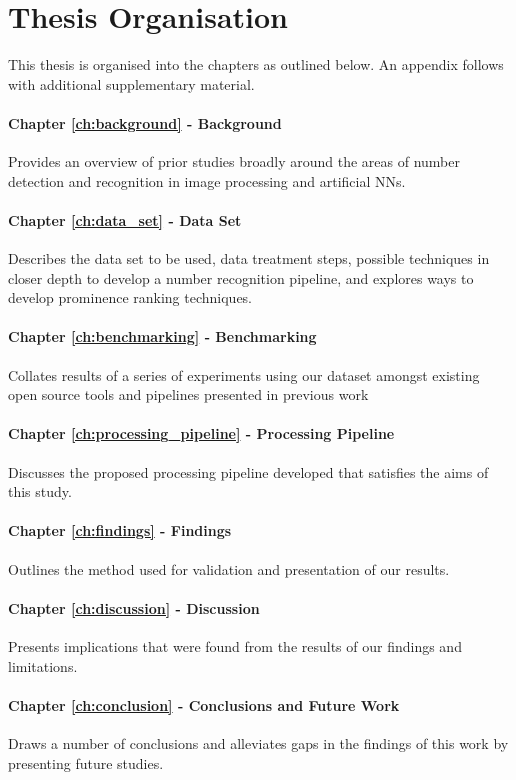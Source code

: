 \section{Thesis Organisation}

This thesis is organised into the chapters as outlined below. An appendix follows with additional supplementary material.

\paragraph{Chapter \ref{ch:background} - Background} Provides an overview of prior studies broadly around the areas of number detection and recognition in image processing and artificial NNs.

\paragraph{Chapter \ref{ch:data_set} - Data Set} Describes the data set to be used, data treatment steps, possible techniques in closer depth to develop a number recognition pipeline, and explores ways to develop prominence ranking techniques.

\paragraph{Chapter \ref{ch:benchmarking} - Benchmarking} Collates results of a series of experiments using our dataset amongst existing open source tools and pipelines presented in previous work

\paragraph{Chapter \ref{ch:processing_pipeline} - Processing Pipeline} Discusses the proposed processing pipeline developed that satisfies the aims of this study.

\paragraph{Chapter \ref{ch:findings} - Findings} Outlines the method used for validation and presentation of our results.

\paragraph{Chapter \ref{ch:discussion} - Discussion} Presents implications that were found from the results of our findings and limitations.

\paragraph{Chapter \ref{ch:conclusion} - Conclusions and Future Work} Draws a number of conclusions and alleviates gaps in the findings of this work by presenting future studies.